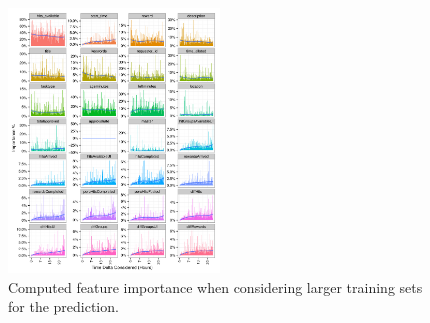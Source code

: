 \begin{figure}[tb]
	\centering
		\includegraphics[width=0.5\textwidth]{figures/importances}
	\caption{Computed feature importance when considering larger training sets for the prediction.}
	\label{fig:importances}
\end{figure}
